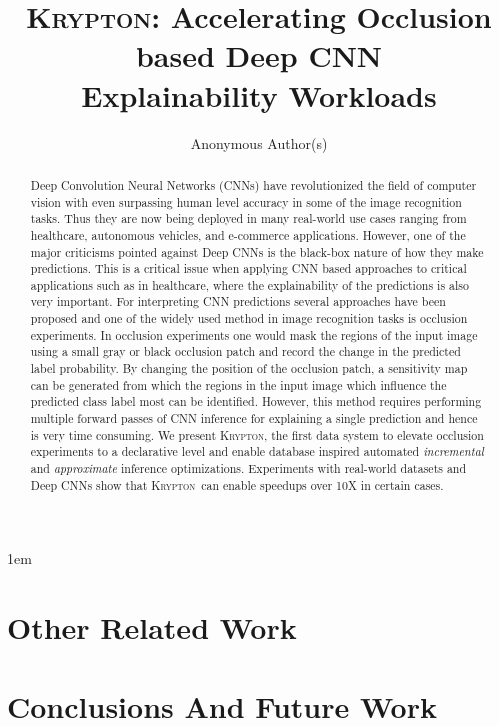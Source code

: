 \documentclass[10pt, sigconf]{acmart}
\newcommand{\system}{\textsc{Krypton}}
\begin{document}
\emergencystretch 1em

\title{\textsc{Krypton}: Accelerating Occlusion based Deep CNN\\ Explainability Workloads}

\author{Anonymous Author(s)}


\begin{abstract}
Deep Convolution Neural Networks (CNNs) have revolutionized the field of computer vision with even surpassing human level accuracy in some of the image recognition tasks. Thus they are now being deployed in many real-world use cases ranging from healthcare, autonomous vehicles, and e-commerce applications. However, one of the major criticisms pointed against Deep CNNs is the black-box nature of how they make predictions. This is a critical issue when applying CNN based approaches to critical applications such as in healthcare, where the explainability of the predictions is also very important. For interpreting CNN predictions several approaches have been proposed and one of the widely used method in image recognition tasks is occlusion experiments. In occlusion experiments one would mask the regions of the input image using a small gray or black occlusion patch and record the change in the predicted label probability. By changing the position of the occlusion patch, a sensitivity map can be generated from which the regions in the input image which influence the predicted class label most can be identified. However, this method requires performing multiple forward passes of CNN inference for explaining a single prediction and hence is very time consuming.
We present \system, the first data system to elevate occlusion experiments to a declarative level and enable database inspired automated \textit{incremental} and \textit{approximate} inference optimizations. Experiments with real-world datasets and Deep CNNs show that \system~can enable speedups over 10X in certain cases.
\end{abstract}

\maketitle











\section{Other Related Work}

\section{Conclusions And Future Work}





\end{document}
